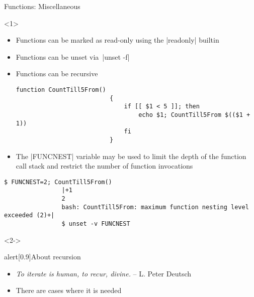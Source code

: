 \begin{frame}[fragile]{Functions: Miscellaneous}
    \begin{overlayarea}{\textwidth}{0.7\textheight}
        \begin{onlyenv}<1>
            \vspace{-3mm}
            \begin{itemize}
                \item Functions can be marked as read-only using the \bash|readonly| builtin
                \item Functions can be unset via \,\bash|unset -f|
                \item Functions can be recursive
                      \begin{lstlisting}[style=MyBash, xrightmargin=12mm, aboveskip=2mm, belowskip=-6mm]
                          function CountTill5From()
                          {
                              if [[ $1 < 5 ]]; then
                                  echo $1; CountTill5From $(($1 + 1))
                              fi
                          }
                      \end{lstlisting}
                \item The \bash|FUNCNEST| variable may be used to limit the depth of the function call stack and restrict the number of function invocations
            \end{itemize}
            \begin{lstlisting}[style=MyBash, xrightmargin=-2mm, xleftmargin=2mm, aboveskip=0mm, numbers=none]
                $ FUNCNEST=2; CountTill5From()
                |+1
                2
                bash: CountTill5From: maximum function nesting level exceeded (2)+|
                $ unset -v FUNCNEST
            \end{lstlisting}
        \end{onlyenv}
        \begin{onlyenv}<2->
            \vspace{-9mm}
            \begin{varblock}{alert}[0.9\textwidth]{About recursion}
                \begin{itemize}
                    \item \emph{\guillemotleft To iterate is human, to recur, divine.\guillemotright} -- L. Peter Deutsch
                    \item There are cases where it is needed

\end{itemize}
\end{varblock}
\end{onlyenv}
\end{overlayarea}
\end{frame}
